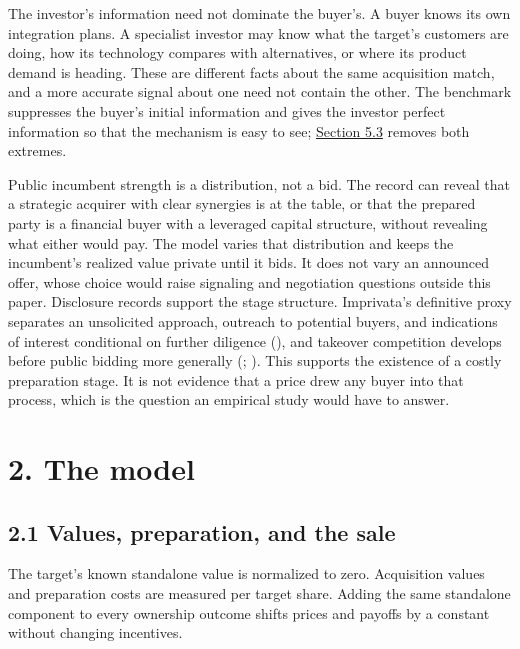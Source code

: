 \documentclass[
  12pt,
]{article}
\begin{document}
The investor's information need not dominate the buyer's. A buyer knows
its own integration plans. A specialist investor may know what the
target's customers are doing, how its technology compares with
alternatives, or where its product demand is heading. These are
different facts about the same acquisition match, and a more accurate
signal about one need not contain the other. The benchmark suppresses
the buyer's initial information and gives the investor perfect
information so that the mechanism is easy to see;
\hyperref[sec-complementary-private-information]{Section 5.3} removes
both extremes.

Public incumbent strength is a distribution, not a bid. The record can
reveal that a strategic acquirer with clear synergies is at the table,
or that the prepared party is a financial buyer with a leveraged capital
structure, without revealing what either would pay. The model varies
that distribution and keeps the incumbent's realized value private until
it bids. It does not vary an announced offer, whose choice would raise
signaling and negotiation questions outside this paper. Disclosure
records support the stage structure. Imprivata's definitive proxy
separates an unsolicited approach, outreach to potential buyers, and
indications of interest conditional on further diligence
(), and takeover
competition develops before public bidding more generally
(;
). This supports
the existence of a costly preparation stage. It is not evidence that a
price drew any buyer into that process, which is the question an
empirical study would have to answer.

\section{2. The model}\label{sec-model}

\subsection{2.1 Values, preparation, and the
sale}\label{sec-values-preparation-and-the-sale}

The target's known standalone value is normalized to zero. Acquisition
values and preparation costs are measured per target share. Adding the
same standalone component to every ownership outcome shifts prices and
payoffs by a constant without changing incentives.
\end{document}
